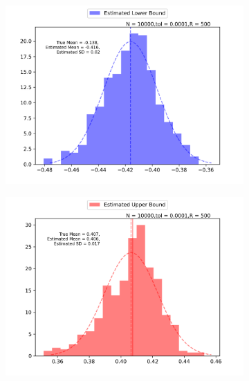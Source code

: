 \documentclass{article}
\begin{document}
\begin{figure}[h!]
    \caption{Distribution of Estimator for $LATE(0.35, 0.9)$ by $N$ \label{fig:histos}}
     \centering

     \begin{subfigure}[b]{0.49\textwidth}
         \centering
          \includegraphics[width=\textwidth]{graph/histo_beta_lo10000_500_0.0001.png}
     \end{subfigure}
    \hfill
     \begin{subfigure}[b]{0.49\textwidth}
         \centering
          \includegraphics[width=\textwidth]{graph/histo_beta_hi10000_500_0.0001.png}
        \end{subfigure}


\end{figure}
\end{document}
